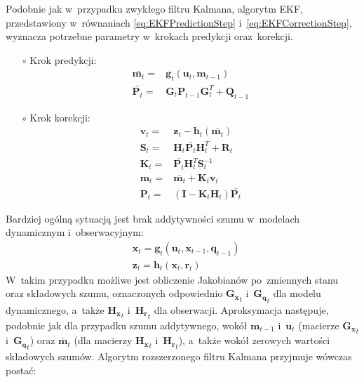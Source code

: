 Podobnie jak w~przypadku zwykłego filtru Kalmana, algorytm EKF, przedstawiony w~równaniach \ref{eq:EKFPredictionStep} i~\ref{eq:EKFCorrectionStep}, wyznacza potrzebne parametry w~krokach predykcji oraz~korekcji.
\begin{itemize}
	\item[$\circ$] Krok predykcji:
	\begin{align}\label{eq:EKFPredictionStep}
	\bar{\boldsymbol{m}_{t}} =& \boldsymbol{g}_t(\boldsymbol{u}_t, \boldsymbol{m}_{t-1}) \nonumber \\
	\bar{\mathbf{P}_{t}} =& \mathbf{G}_{t} \mathbf{P}_{t-1} \mathbf{G}_{t}^T + \mathbf{Q}_{t-1}
	\end{align}
	\item[$\circ$] Krok korekcji:
	\begin{align}\label{eq:EKFCorrectionStep}
	\mathbf{v}_t=&\mathbf{z}_t-\boldsymbol{h}_t(\bar{\boldsymbol{m}_{t}}) \nonumber \\
	\mathbf{S}_t=&\mathbf{H}_t \bar{\mathbf{P}_{t}} \mathbf{H}_t^T + \mathbf{R}_t \nonumber \\
	\mathbf{K}_t=&\bar{\mathbf{P}_{t}} \mathbf{H}_t^T \mathbf{S}_t^{-1}\nonumber \\
	\mathbf{m}_{t}=&\bar{\mathbf{m}_{t}} + \mathbf{K}_t \mathbf{v}_t\nonumber \\
	\mathbf{P}_{t}=&(\mathbf{I} - \mathbf{K}_t \mathbf{H}_t) \bar{\mathbf{P}_{t}}
	\end{align}
\end{itemize}
Bardziej ogólną sytuacją jest brak addytywności szumu w~modelach dynamicznym i~obserwacyjnym:
\begin{align}
	&\boldsymbol{x}_t = \boldsymbol{g}_t(\boldsymbol{u}_t, \boldsymbol{x}_{t-1}, \boldsymbol{q}_{t-1}) \nonumber \\
	&\boldsymbol{z}_t = \boldsymbol{h}_t(\boldsymbol{x}_{t}, \boldsymbol{r}_{t})
\end{align}
W~takim przypadku możliwe jest obliczenie Jakobianów po~zmiennych stanu oraz składowych szumu, oznaczonych odpowiednio $\boldsymbol{G_x}_t$ i~$\boldsymbol{G_q}_t$ dla modelu dynamicznego, a~także $\boldsymbol{H_x}_t$ i~$\boldsymbol{H_r}_t$ dla obserwacji. Aproksymacja następuje, podobnie jak dla przypadku szumu addytywnego, wokół $\boldsymbol{m}_{t-1}$ i~$\boldsymbol{u}_{t}$ (macierze $\mathbf{G_x}_{t}$ i~$\mathbf{G_q}_{t}$) oraz $\bar{\boldsymbol{m}}_{t}$ (dla macierzy $\mathbf{H_x}_{t}$ i~$\mathbf{H_r}_{t}$), a~także wokół zerowych wartości składowych szumów. Algorytm rozszerzonego filtru Kalmana przyjmuje wówczas postać:
